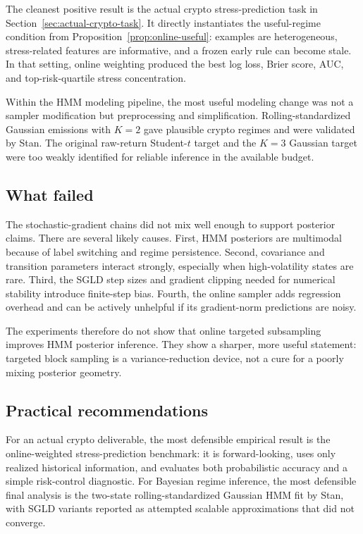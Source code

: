 \documentclass{article}
\newcommand{\1}{\mathbf{1}}
\begin{document}
The cleanest positive result is the actual crypto stress-prediction task in Section~\ref{sec:actual-crypto-task}. It directly instantiates the useful-regime condition from Proposition~\ref{prop:online-useful}: examples are heterogeneous, stress-related features are informative, and a frozen early rule can become stale. In that setting, online weighting produced the best log loss, Brier score, AUC, and top-risk-quartile stress concentration.

Within the HMM modeling pipeline, the most useful modeling change was not a sampler modification but preprocessing and simplification. Rolling-standardized Gaussian emissions with $K=2$ gave plausible crypto regimes and were validated by Stan. The original raw-return Student-$t$ target and the $K=3$ Gaussian target were too weakly identified for reliable inference in the available budget.

\subsection{What failed}

The stochastic-gradient chains did not mix well enough to support posterior claims. There are several likely causes. First, HMM posteriors are multimodal because of label switching and regime persistence. Second, covariance and transition parameters interact strongly, especially when high-volatility states are rare. Third, the SGLD step sizes and gradient clipping needed for numerical stability introduce finite-step bias. Fourth, the online sampler adds regression overhead and can be actively unhelpful if its gradient-norm predictions are noisy.

The experiments therefore do not show that online targeted subsampling improves HMM posterior inference. They show a sharper, more useful statement: targeted block sampling is a variance-reduction device, not a cure for a poorly mixing posterior geometry.

\subsection{Practical recommendations}

For an actual crypto deliverable, the most defensible empirical result is the online-weighted stress-prediction benchmark: it is forward-looking, uses only realized historical information, and evaluates both probabilistic accuracy and a simple risk-control diagnostic. For Bayesian regime inference, the most defensible final analysis is the two-state rolling-standardized Gaussian HMM fit by Stan, with SGLD variants reported as attempted scalable approximations that did not converge.
\end{document}
